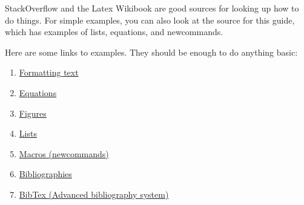 \documentclass{article}
\begin{document}
StackOverflow\cite{stack_overflow} and the Latex Wikibook\cite{wikibook_latex} are good sources for looking up how to do things. For simple examples, you can also look at the source\cite{this} for this guide, which has examples of lists, equations, and newcommands.

Here are some links to examples. They should be enough to do anything basic:
\begin{enumerate}
\item \href{https://www.sharelatex.com/learn/Bold,_italics_and_underlining}{Formatting text}

\item \href{http://en.wikibooks.org/wiki/LaTeX/Mathematics}{Equations}

\item \href{http://en.wikibooks.org/wiki/LaTeX/Floats,_Figures_and_Captions}{Figures}

\item \href{http://en.wikibooks.org/wiki/LaTeX/List_Structures}{Lists}

\item \href{http://en.wikibooks.org/wiki/LaTeX/Macros}{Macros (newcommands)}

\item \href{http://en.wikibooks.org/wiki/LaTeX/Bibliography_Management}{Bibliographies}

\item \href{https://www.sharelatex.com/learn/Bibliography_management_with_bibtex}{BibTex (Advanced bibliography system)}
\end{enumerate}

{}

\end{document}
